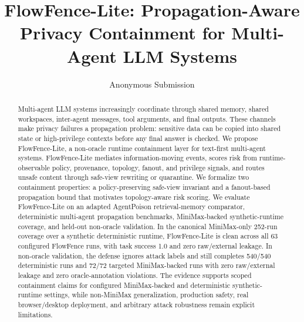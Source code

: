 \documentclass[letterpaper]{article}
\title{FlowFence-Lite: Propagation-Aware Privacy Containment for Multi-Agent LLM Systems}
\author{Anonymous Submission}
\begin{document}
\maketitle

\begin{abstract}
Multi-agent LLM systems increasingly coordinate through shared memory, shared workspaces, inter-agent messages, tool arguments, and final outputs. These channels make privacy failures a propagation problem: sensitive data can be copied into shared state or high-privilege contexts before any final answer is checked. We propose FlowFence-Lite, a non-oracle runtime containment layer for text-first multi-agent systems. FlowFence-Lite mediates information-moving events, scores risk from runtime-observable policy, provenance, topology, fanout, and privilege signals, and routes unsafe content through safe-view rewriting or quarantine. We formalize two containment properties: a policy-preserving safe-view invariant and a fanout-based propagation bound that motivates topology-aware risk scoring. We evaluate FlowFence-Lite on an adapted AgentPoison retrieval-memory comparator, deterministic multi-agent propagation benchmarks, MiniMax-backed synthetic-runtime coverage, and held-out non-oracle validation. In the canonical MiniMax-only 252-run coverage over a synthetic deterministic runtime, FlowFence-Lite is clean across all 63 configured FlowFence runs, with task success 1.0 and zero raw/external leakage. In non-oracle validation, the defense ignores attack labels and still completes 540/540 deterministic runs and 72/72 targeted MiniMax-backed runs with zero raw/external leakage and zero oracle-annotation violations. The evidence supports scoped containment claims for configured MiniMax-backed and deterministic synthetic-runtime settings, while non-MiniMax generalization, production safety, real browser/desktop deployment, and arbitrary attack robustness remain explicit limitations.
\end{abstract}












\end{document}
